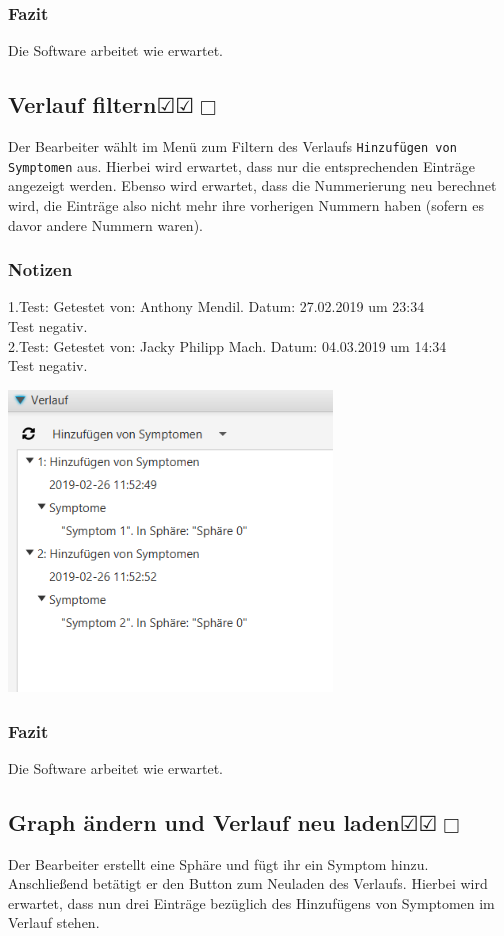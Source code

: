 \documentclass[enabledeprecatedfontcommands]{scrartcl}
\newcommand{\subsectiont}[2]{\subsection[#1]{#1{\normalsize\normalfont #2}}}
\newcommand{\leer}{$\Box$}
\newcommand{\ok}{$\CheckedBox$}
\begin{document}
\subsubsection{Fazit}
Die Software arbeitet wie erwartet.

\subsectiont{Verlauf filtern}{\dotfill\ok\ok\leer}
Der Bearbeiter wählt im Menü zum Filtern des Verlaufs \texttt{Hinzufügen von Symptomen} aus. Hierbei wird erwartet, dass nur die entsprechenden Einträge angezeigt werden. Ebenso wird erwartet, dass die Nummerierung neu berechnet wird, die Einträge also nicht mehr ihre vorherigen Nummern haben (sofern es davor andere Nummern waren). 
\subsubsection{Notizen}
1.Test: Getestet von: Anthony Mendil. Datum: 27.02.2019 um 23:34 \\
Test negativ. \\
2.Test: Getestet von: Jacky Philipp Mach. Datum: 04.03.2019 um 14:34 \\
Test negativ.
\begin{center}
\includegraphics[height=8cm]{verlaufFiltern.PNG}
\end{center}
\subsubsection{Fazit}
Die Software arbeitet wie erwartet.

\subsectiont{Graph ändern und Verlauf neu laden}{\dotfill\ok\ok\leer}
Der Bearbeiter erstellt eine Sphäre und fügt ihr ein Symptom hinzu. Anschließend betätigt er den Button zum Neuladen des Verlaufs. Hierbei wird erwartet, dass nun drei Einträge bezüglich des Hinzufügens von Symptomen im Verlauf stehen.
\end{document}
